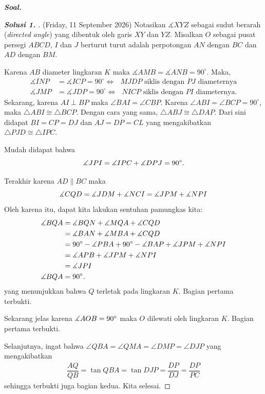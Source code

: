 \textbf{\textit{Soal.}} 
\begin{proof}[\textbf{Solusi 1. }] (Friday, 11 September 2026) 
Notasikan $\measuredangle XYZ$ sebagai sudut berarah (\textit{directed angle}) yang dibentuk oleh garis $XY$ dan $YZ$.
Misalkan $O$ sebagai pusat persegi $ABCD$, $I$ dan $J$ berturut turut adalah perpotongan $AN$ dengan $BC$ dan $AD$ dengan $BM$.

Karena $AB$ diameter lingkaran $K$ maka $\measuredangle AMB = \measuredangle ANB = 90^\circ$. Maka,
\begin{align*}
    \measuredangle INP &= \measuredangle ICP = 90^\circ \iff \text{ $MJDP$ siklis dengan $PJ$ diameternya}\\
    \measuredangle JMP &= \measuredangle JDP = 90^\circ \iff \text{ $NICP$ siklis dengan $PI$ diameternya.}
\end{align*}
Sekarang, karena $AI \perp BP$ maka $\angle BAI = \angle CBP$. Karena $\angle ABI = \angle BCP = 90^\circ$, maka $\triangle ABI \cong \triangle BCP$. Dengan cara yang sama, $\triangle ABJ \cong \triangle DAP$.
Dari sini didapat $BI = CP = DJ$ dan $AJ = DP = CL$ yang mengakibatkan $\triangle PJD \cong \triangle IPC$.

Mudah didapat bahwa 
$$\measuredangle JPI = \measuredangle IPC + \measuredangle DPJ = 90^\circ.$$

Terakhir karena $AD \parallel BC$ maka $$\measuredangle CQD = \measuredangle JDM + \measuredangle NCI = \measuredangle JPM + \measuredangle NPI$$
Oleh karena itu, dapat kita lakukan sentuhan pamungkas kita:
\begin{align*}
    \measuredangle BQA &= \measuredangle BQN + \measuredangle MQA+ \measuredangle CQD\\
    &= \measuredangle BAN + \measuredangle MBA + \measuredangle CQD\\
    &= 90^\circ - \measuredangle PBA + 90^\circ - \measuredangle BAP + \measuredangle JPM + \measuredangle NPI\\
    &= \measuredangle APB + \measuredangle JPM + \measuredangle NPI\\
    &= \measuredangle JPI\\
    \measuredangle BQA &= 90^\circ.
\end{align*}
yang menunjukkan bahwa $Q$ terletak pada lingkaran $K$. Bagian pertama terbukti.

Sekarang jelas karena $\measuredangle AOB = 90^\circ$ maka $O$ dilewati oleh lingkaran $K$. Bagian pertama terbukti.

Selanjutnya, ingat bahwa $\angle QBA = \angle QMA = \angle DMP = \angle DJP$ yang mengakibatkan
\begin{align*}
    \dfrac{AQ}{QB} = \tan QBA = \tan DJP = \dfrac{DP}{DJ} = \dfrac{DP}{PC}
\end{align*}
sehingga terbukti juga bagian kedua. Kita selesai.
\end{proof}

